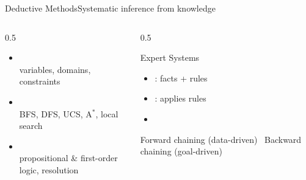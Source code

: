 \documentclass[aspectratio=169,11pt]{beamer}
\begin{document}
\begin{frame}{Deductive Methods}{Systematic inference from knowledge}
  \begin{columns}[T]
    \begin{column}{0.5\textwidth}
      \begin{itemize}
        \item {}\\
          \scriptsize variables, domains, constraints
        \item {}\\
          \scriptsize BFS, DFS, UCS, A$^\ast$, local search
        \item {}\\
          \scriptsize propositional \& first-order logic, resolution
      \end{itemize}
    \end{column}
    \begin{column}{0.5\textwidth}
      \begin{block}{Expert Systems}
        \small
        \begin{itemize}
          \item {}: facts + rules
          \item {}: applies rules
          \item {}
        \end{itemize}
        \scriptsize Forward chaining (data-driven) \textbullet\
        Backward chaining (goal-driven)
      \end{block}
    \end{column}
  \end{columns}
\end{frame}
\end{document}
